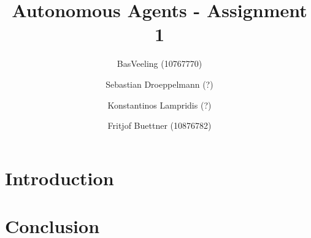 \documentclass[11pt,a4paper]{article}
\begin{document}
\title{Autonomous Agents - Assignment 1}
\author{BasVeeling (10767770) \\ \and Sebastian Droeppelmann (?) \\ \and Konstantinos Lampridis (?) \\ \and Fritjof Buettner (10876782)}
\maketitle
\section{Introduction}

\section{Conclusion}
\end{document}
